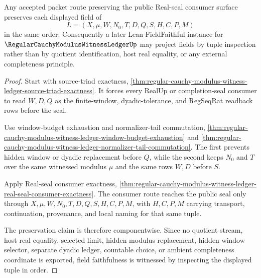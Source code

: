 \begin{theorem}
\label{thm:regular-cauchy-modulus-witness-ledger-route-field-faithfulness}
Any accepted packet route preserving the public Real-seal consumer surface preserves each displayed field of
$$
L=(X,\mu,W,N_0,T,D,Q,S,H,C,P,M)
$$
in the same order. Consequently a later Lean FieldFaithful instance for $\RegularCauchyModulusWitnessLedgerUp$ may project fields by tuple inspection rather than by quotient identification, host real equality, or any external completeness principle.
\end{theorem}
\begin{proof}
Start with source-triad exactness, \autoref{thm:regular-cauchy-modulus-witness-ledger-source-triad-exactness}. It forces every RealUp or completion-seal consumer to read $W,D,Q$ as the finite-window, dyadic-tolerance, and RegSeqRat readback rows before the seal.

Use window-budget exhaustion and normalizer-tail commutation, \autoref{thm:regular-cauchy-modulus-witness-ledger-window-budget-exhaustion} and \autoref{thm:regular-cauchy-modulus-witness-ledger-normalizer-tail-commutation}. The first prevents hidden window or dyadic replacement before $Q$, while the second keeps $N_0$ and $T$ over the same witnessed modulus $\mu$ and the same rows $W,D$ before $S$.

Apply Real-seal consumer exactness, \autoref{thm:regular-cauchy-modulus-witness-ledger-real-seal-consumer-exactness}. The consumer route reaches the public seal only through $X,\mu,W,N_0,T,D,Q,S,H,C,P,M$, with $H,C,P,M$ carrying transport, continuation, provenance, and local naming for that same tuple.

The preservation claim is therefore componentwise. Since no quotient stream, host real equality, selected limit, hidden modulus replacement, hidden window selector, separate dyadic ledger, countable choice, or ambient completeness coordinate is exported, field faithfulness is witnessed by inspecting the displayed tuple in order.
\end{proof}

